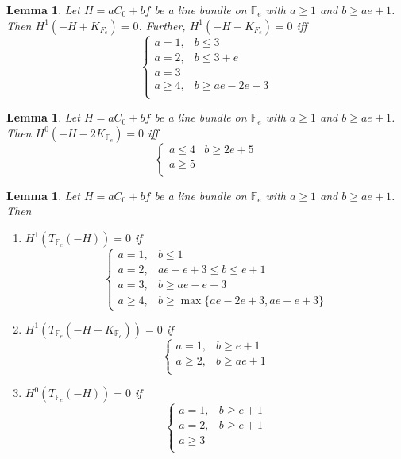 \documentclass[11pt,twoside]{amsart}
\theoremstyle{plain}
\numberwithin{equation}{section}
\newtheorem{lemma}[theorem]{Lemma}
\theoremstyle{definition}
\begin{document}
\begin{lemma}\label{-H-K_Y}
Let $H = aC_0+bf$ be a line bundle on $\mathbb{F}_e$ with $a \geq 1$ and $b \geq ae+1$. Then $H^1(-H+K_{F_e}) = 0$. Further, $H^1(-H-K_{F_e}) = 0$ iff 
 \[
\begin{cases}
   a = 1, & b \leq 3  \\
   a = 2, & b \leq 3+e \\
   a = 3 & \\
   a \geq 4, & b \geq ae-2e+3 \\
\end{cases}
 \]

\end{lemma}



\begin{lemma}\label{-H-2K_Y}
Let $H = aC_0+bf$ be a line bundle on $\mathbb{F}_e$ with $a \geq 1$ and $b \geq ae+1$. Then $H^0(-H-2K_{\mathbb{F}_e}) = 0$ iff 
\[
\begin{cases}
   a \leq 4 & b \geq 2e+5  \\
   a \geq 5 &   \\
   
\end{cases}
\]
    
\end{lemma}

\begin{lemma}\label{T_Y(-H)}
Let $H = aC_0+bf$ be a line bundle on $\mathbb{F}_e$ with $a \geq 1$ and $b \geq ae+1$. Then 
\begin{enumerate}
    \item[(1)] $H^1(T_{\mathbb{F}_e}(-H)) = 0$ if 
\[
\begin{cases}
   a = 1, & b \leq 1  \\
   a = 2, & ae-e+3 \leq b \leq e+1  \\
   a = 3, & b \geq ae-e+3 \\
   a \geq 4, & b \geq \operatorname{max}\{ae-2e+3, ae-e+3\}
   
\end{cases}
\]

  \item[(2)] $H^1(T_{\mathbb{F}_e}(-H+K_{\mathbb{F}_e})) = 0$ if 
\[
\begin{cases}
   a = 1, & b \geq e+1  \\
   a \geq 2, & b \geq ae+1 \\
\end{cases}
\] 

\item[(3)] $H^0(T_{\mathbb{F}_e}(-H)) = 0$ if 
\[
\begin{cases}
   a = 1, & b \geq e+1  \\
   a = 2, & b \geq e+1 \\
   a \geq 3 & \\
\end{cases}
\] 

\end{enumerate}

\end{lemma}
\end{document}
